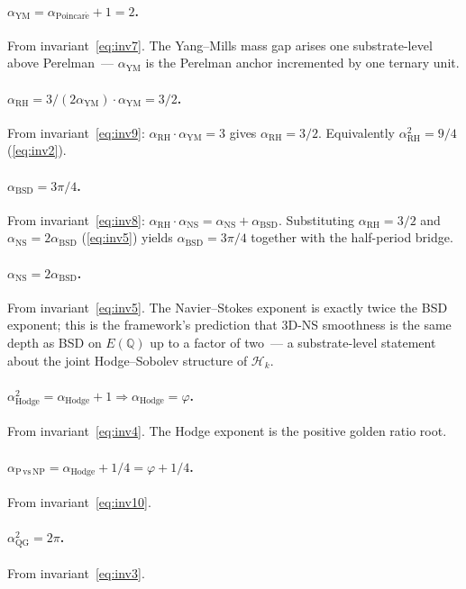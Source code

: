 \documentclass[11pt,a4paper]{article}
\theoremstyle{definition}
\theoremstyle{remark}
\newcommand{\rationals}{\mathbb{Q}}
\newcommand{\HilbertK}{\mathcal{H}_{k}}
\newcommand{\alphaRH}{\alpha_{\mathrm{RH}}}
\newcommand{\alphaYM}{\alpha_{\mathrm{YM}}}
\newcommand{\alphaP}{\alpha_{\mathrm{Poincar\acute{e}}}}
\newcommand{\alphaBSD}{\alpha_{\mathrm{BSD}}}
\newcommand{\alphaNS}{\alpha_{\mathrm{NS}}}
\newcommand{\alphaH}{\alpha_{\mathrm{Hodge}}}
\newcommand{\alphaNP}{\alpha_{\mathrm{P\,vs\,NP}}}
\newcommand{\alphaQG}{\alpha_{\mathrm{QG}}}
\begin{document}
\paragraph{$\alphaYM = \alphaP + 1 = 2$.}
From invariant~\eqref{eq:inv7}. The Yang--Mills mass gap arises
one substrate-level above Perelman~--- $\alphaYM$ is the
Perelman anchor incremented by one ternary unit.

\paragraph{$\alphaRH = 3/(2\alphaYM) \cdot \alphaYM = 3/2$.}
From invariant~\eqref{eq:inv9}: $\alphaRH \cdot \alphaYM = 3$
gives $\alphaRH = 3/2$. Equivalently
$\alphaRH^{2} = 9/4$ (\eqref{eq:inv2}).

\paragraph{$\alphaBSD = 3\pi/4$.}
From invariant~\eqref{eq:inv8}: $\alphaRH \cdot \alphaNS
= \alphaNS + \alphaBSD$. Substituting $\alphaRH = 3/2$ and
$\alphaNS = 2\alphaBSD$ (\eqref{eq:inv5}) yields
$\alphaBSD = 3\pi/4$ together with the half-period bridge.

\paragraph{$\alphaNS = 2\alphaBSD$.}
From invariant~\eqref{eq:inv5}. The Navier--Stokes exponent is
exactly twice the BSD exponent; this is the framework's prediction
that 3D-NS smoothness is the same depth as BSD on $E(\rationals)$
up to a factor of two~--- a substrate-level statement about the
joint Hodge--Sobolev structure of $\HilbertK$.

\paragraph{$\alphaH^{2} = \alphaH + 1 \Rightarrow \alphaH = \varphi$.}
From invariant~\eqref{eq:inv4}. The Hodge exponent is the positive
golden ratio root.

\paragraph{$\alphaNP = \alphaH + 1/4 = \varphi + 1/4$.}
From invariant~\eqref{eq:inv10}.

\paragraph{$\alphaQG^{2} = 2\pi$.}
From invariant~\eqref{eq:inv3}.
\end{document}

